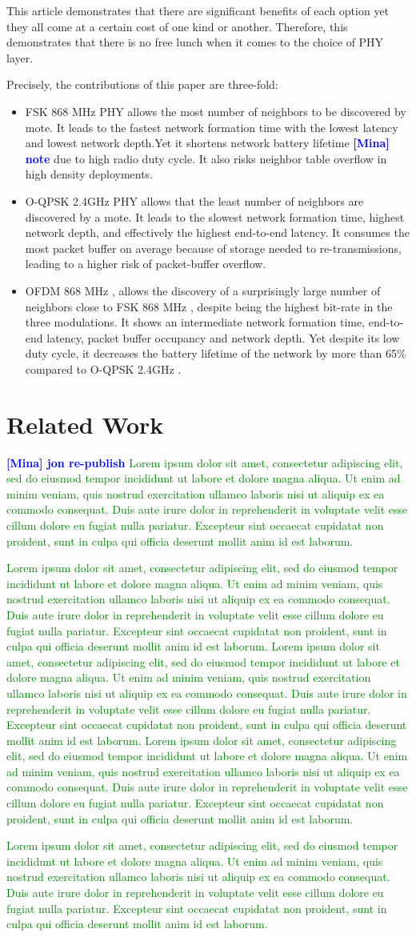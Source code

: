 \documentclass[journal]{IEEEtran}
\newcommand{\fsk}          {FSK 868 MHz }
\newcommand{\oqpsk}        {O-QPSK 2.4GHz }
\newcommand{\ofdm}         {OFDM 868 MHz }
\newcommand{\lorem}        {\textcolor{green}{Lorem ipsum dolor sit amet, consectetur adipiscing elit, sed do eiusmod tempor incididunt ut labore et dolore magna aliqua. Ut enim ad minim veniam, quis nostrud exercitation ullamco laboris nisi ut aliquip ex ea commodo consequat. Duis aute irure dolor in reprehenderit in voluptate velit esse cillum dolore eu fugiat nulla pariatur. Excepteur sint occaecat cupidatat non proident, sunt in culpa qui officia deserunt mollit anim id est laborum.}}
\newcommand{\mina}[1]      {\textbf{\textcolor{blue}{[Mina] #1}}}
\begin{document}
 
This article demonstrates that there are significant benefits of each option yet they all come at a certain cost of one kind or another.
Therefore, this demonstrates that there is no free lunch when it comes to the choice of PHY layer.

Precisely, the contributions of this paper are three-fold:

\begin{itemize}
   \item \fsk PHY allows the most number of neighbors to be discovered by mote. 
    It leads to the fastest network formation time with the lowest latency and lowest network depth.Yet it shortens network battery lifetime \mina{note} due to high radio duty cycle. 
    It also risks neighbor table overflow in high density deployments.
   
   \item \oqpsk PHY allows that the least number of neighbors are discovered by a mote. 
   It leads to the slowest network formation time, highest network depth, and effectively the highest end-to-end latency. 
   It consumes the most packet buffer on average because of storage needed to re-transmissions, leading to a higher risk of packet-buffer overflow. 
   
   \item \ofdm, allows the discovery of a surprisingly large number of neighbors close to \fsk, despite being the highest bit-rate in the three modulations. 
   It shows an intermediate network formation time, end-to-end latency, packet buffer occupancy and network depth.
   Yet despite its low duty cycle, it decreases the battery lifetime of the network by more than 65\% compared to \oqpsk.
\end{itemize}
  


\section{Related Work}
\label{sec:related_work}

\cite{j.munoz18problem} \mina{jon re-publish}
\lorem



\cite{munoz18evaluationa}
\lorem
\cite{sum17experimental}
\lorem
\cite{munoz18overview}
\lorem

\lorem
\cite{yang18analysis}
\cite{sum17experimental}
\cite{theoleyre16experimental}
\cite{teleshermeto18reactions}
\cite{kojima15system}
\cite{benyaala16performance}
\end{document}
